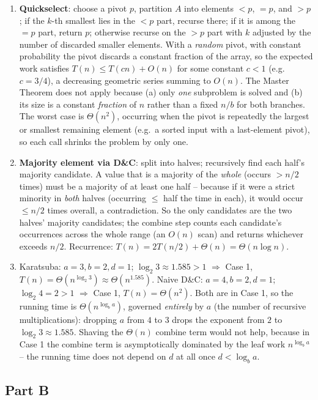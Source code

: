 \documentclass[11pt]{article}
\begin{document}
\begin{enumerate}[label=\textbf{A\arabic*.}, leftmargin=2.2em]
\item \textbf{Quickselect}: choose a pivot $p$, partition $A$ into elements $<p$, $=p$, and
$>p$; if the $k$-th smallest lies in the $<p$ part, recurse there; if it is among the $=p$
part, return $p$; otherwise recurse on the $>p$ part with $k$ adjusted by the number of
discarded smaller elements. With a \emph{random} pivot, with constant probability the pivot
discards a constant fraction of the array, so the expected work satisfies $T(n) \le T(cn) +
O(n)$ for some constant $c < 1$ (e.g.\ $c = 3/4$), a decreasing geometric series summing to
$O(n)$. The Master Theorem does not apply because (a) only \emph{one} subproblem is solved
and (b) its size is a constant \emph{fraction} of $n$ rather than a fixed $n/b$ for both
branches. The worst case is $\Theta(n^2)$, occurring when the pivot is repeatedly the
largest or smallest remaining element (e.g.\ a sorted input with a last-element pivot), so
each call shrinks the problem by only one.

\item \textbf{Majority element via D\&C}: split into halves; recursively find each half's
majority candidate. A value that is a majority of the \emph{whole} (occurs $> n/2$ times)
must be a majority of at least one half -- because if it were a strict minority in
\emph{both} halves (occurring $\le$ half the time in each), it would occur $\le n/2$ times
overall, a contradiction. So the only candidates are the two halves' majority candidates;
the combine step counts each candidate's occurrences across the whole range (an $O(n)$
scan) and returns whichever exceeds $n/2$. Recurrence: $T(n) = 2T(n/2) + \Theta(n) =
\Theta(n \log n)$.

\item Karatsuba: $a=3,b=2,d=1$; $\log_2 3 \approx 1.585 > 1$ $\Rightarrow$ Case 1, $T(n) =
\Theta(n^{\log_2 3}) \approx \Theta(n^{1.585})$. Naive D\&C: $a=4,b=2,d=1$; $\log_2 4 = 2 >
1$ $\Rightarrow$ Case 1, $T(n) = \Theta(n^2)$. Both are in Case 1, so the running time is
$\Theta(n^{\log_b a})$, governed \emph{entirely} by $a$ (the number of recursive
multiplications): dropping $a$ from $4$ to $3$ drops the exponent from $2$ to $\log_2 3
\approx 1.585$. Shaving the $\Theta(n)$ combine term would not help, because in Case 1 the
combine term is asymptotically dominated by the leaf work $n^{\log_b a}$ -- the running time
does not depend on $d$ at all once $d < \log_b a$.

\end{enumerate}

\subsection*{Part B}
\end{document}
